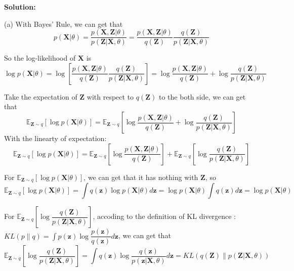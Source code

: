 \documentclass[10pt]{article}
\begin{document}
\begin{enumerate}[1.]
\begin{itemize}
     
	      \end{itemize}


		  \textbf{Solution:}

(a) With Bayes' Rule, we can get that
$$p(\boldsymbol{X}|\theta)=\dfrac{p(\boldsymbol{X},\boldsymbol{Z}|\theta)}{p(\boldsymbol{Z}|\boldsymbol{X},\theta)}
=\dfrac{p(\boldsymbol{X},\boldsymbol{Z}|\theta)}{q(\boldsymbol{Z})}\dfrac{q(\boldsymbol{Z})}{p(\boldsymbol{Z}|\boldsymbol{X},\theta)}$$

So the log-likelihood of $\boldsymbol{X}$ is
$$\log p(\boldsymbol{X}|\theta)=\log\left [\dfrac{p(\boldsymbol{X},\boldsymbol{Z}|\theta)}{q(\boldsymbol{Z})}\dfrac{q(\boldsymbol{Z})}{p(\boldsymbol{Z}|\boldsymbol{X},\theta)}\right ]
=\log\dfrac{p(\boldsymbol{X},\boldsymbol{Z}|\theta)}{q(\boldsymbol{Z})}+\log\dfrac{q(\boldsymbol{Z})}{p(\boldsymbol{Z}|\boldsymbol{X},\theta)}$$

Take the expectation of $\boldsymbol{Z}$ with respect to $q(\boldsymbol{Z})$ to the both side, we can get that
$$\mathbb{E}_{\boldsymbol{Z}\sim q}\left [\log p(\boldsymbol{X}|\theta)\right ]=\mathbb{E}_{\boldsymbol{Z}\sim q}\left [\log\dfrac{p(\boldsymbol{X},\boldsymbol{Z}|\theta)}{q(\boldsymbol{Z})}+\log\dfrac{q(\boldsymbol{Z})}{p(\boldsymbol{Z}|\boldsymbol{X},\theta)}\right ]$$
With the linearty of expectation:
$$\mathbb{E}_{\boldsymbol{Z}\sim q}\left [\log p(\boldsymbol{X}|\theta)\right ]=\mathbb{E}_{\boldsymbol{Z}\sim q}\left [\log\dfrac{p(\boldsymbol{X},\boldsymbol{Z}|\theta)}{q(\boldsymbol{Z})}\right ]+\mathbb{E}_{\boldsymbol{Z}\sim q}\left [\log\dfrac{q(\boldsymbol{Z})}{p(\boldsymbol{Z}|\boldsymbol{X},\theta)}\right ]$$

For $\mathbb{E}_{\boldsymbol{Z}\sim q}\left [\log p(\boldsymbol{X}|\theta)\right ]$, we can get that it has nothing with $\boldsymbol{Z}$, so
$$\mathbb{E}_{\boldsymbol{Z}\sim q}\left [\log p(\boldsymbol{X}|\theta)\right ]
=\int q(\boldsymbol{z})\log p(\boldsymbol{X}|\theta)d\boldsymbol{z}=\log p(\boldsymbol{X}|\theta)\int q(\boldsymbol{z})d\boldsymbol{z}
=\log p(\boldsymbol{X}|\theta)$$

For $\mathbb{E}_{\boldsymbol{Z}\sim q}\left [\log\dfrac{q(\boldsymbol{Z})}{p(\boldsymbol{Z}|\boldsymbol{X},\theta)}\right ]$,
accoding to the definition of KL divergence : $KL(p\|q)=\int p(\boldsymbol{z})\log\dfrac{p(\boldsymbol{z})}{q(\boldsymbol{z})}d\boldsymbol{z}$, we can get that
$$\mathbb{E}_{\boldsymbol{Z}\sim q}\left [\log\dfrac{q(\boldsymbol{Z})}{p(\boldsymbol{Z}|\boldsymbol{X},\theta)}\right ]
=\int q(\boldsymbol{z})\log\dfrac{q(\boldsymbol{z})}{p(\boldsymbol{z}|\boldsymbol{X},\theta)}d\boldsymbol{z}
=KL(q(\boldsymbol{Z})\|p(\boldsymbol{Z}|\boldsymbol{X},\theta))$$


\end{enumerate}
\end{document}
